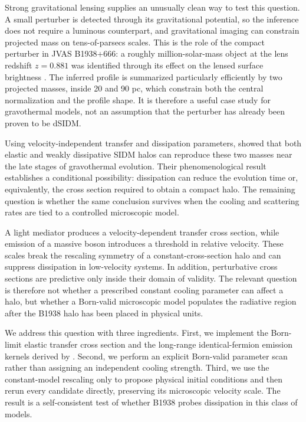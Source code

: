 \documentclass[12pt]{article}
\begin{document}
Strong gravitational lensing supplies an unusually clean way to test this
question.  A small perturber is detected through its gravitational potential,
so the inference does not require a luminous counterpart, and gravitational
imaging can constrain projected mass on tens-of-parsecs scales.  This is the
role of the compact perturber in JVAS B1938+666: a roughly million-solar-mass
object at the lens redshift $z=0.881$ was identified through its effect on the
lensed surface brightness \citep{Powell2025,Vegetti2026}.  The inferred
profile is summarized particularly efficiently by two projected masses,
inside 20 and 90 pc, which constrain both the central normalization and the
profile shape.  It is therefore a useful case study for gravothermal models,
not an assumption that the perturber has already been proven to be dSIDM.

Using velocity-independent transfer and dissipation parameters,
\citet{Schmidt2026} showed that both elastic and weakly dissipative SIDM halos
can reproduce these two masses near the late stages of gravothermal
evolution.  Their phenomenological result establishes a conditional
possibility: dissipation can reduce the evolution time or, equivalently, the
cross section required to obtain a compact halo.  The remaining question is
whether the same conclusion survives when the cooling and scattering rates
are tied to a controlled microscopic model.

A light mediator produces a velocity-dependent transfer cross section, while
emission of a massive boson introduces a threshold in relative velocity.
These scales break the rescaling symmetry of a constant-cross-section halo
and can suppress dissipation in low-velocity systems.  In addition,
perturbative cross sections are predictive only inside their domain of
validity.  The relevant question is therefore not whether a prescribed
constant cooling parameter can affect a halo, but whether a Born-valid
microscopic model populates the radiative region after the B1938 halo has been
placed in physical units.

We address this question with three ingredients.  First, we implement the
Born-limit elastic transfer cross section and the long-range
identical-fermion emission kernels derived by
\citet{LankesterBroche2026}.  Second, we perform an explicit Born-valid
parameter scan rather than assigning an independent cooling strength.  Third,
we use the constant-model rescaling only to propose physical initial
conditions and then rerun every candidate directly, preserving its microscopic
velocity scale.  The result is a self-consistent test of whether B1938 probes
dissipation in this class of models.
\end{document}
